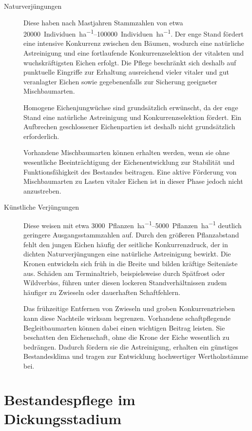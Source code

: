 \documentclass[twocolumn, bibliography=totoc, abstract=true]{scrartcl}
\begin{document}
\begin{description}
\item[Naturverjüngungen]
  Diese haben nach Mastjahren Stammzahlen von etwa \qtyrange{20000}{100000}{Individuen\per\hectare}. Der enge Stand fördert eine intensive Konkurrenz zwischen den Bäumen, wodurch eine natürliche Astreinigung und eine fortlaufende Konkurrenzselektion der vitalsten und wuchskräftigsten Eichen erfolgt. Die Pflege beschränkt sich deshalb auf punktuelle Eingriffe zur Erhaltung ausreichend vieler vitaler und gut veranlagter Eichen sowie gegebenenfalls zur Sicherung geeigneter Mischbaumarten.

  Homogene Eichenjungwüchse sind grundsätzlich erwünscht, da der enge Stand eine natürliche Astreinigung und Konkurrenzselektion fördert. Ein Aufbrechen geschlossener Eichenpartien ist deshalb nicht grundsätzlich erforderlich.

  Vorhandene Mischbaumarten können erhalten werden, wenn sie ohne wesentliche Beeinträchtigung der Eichenentwicklung zur Stabilität und Funktionsfähigkeit des Bestandes beitragen. Eine aktive Förderung von Mischbaumarten zu Lasten vitaler Eichen ist in dieser Phase jedoch nicht anzustreben.

\item[Künstliche Verjüngungen]
  Diese weisen mit etwa \qtyrange{3000}{5000}{Pflanzen\per\hectare} deutlich geringere Ausgangsstammzahlen auf. Durch den größeren Pflanzabstand fehlt den jungen Eichen häufig der seitliche Konkurrenzdruck, der in dichten Naturverjüngungen eine natürliche Astreinigung bewirkt. Die Kronen entwickeln sich früh in die Breite und bilden kräftige Seitenäste aus. Schäden am Terminaltrieb, beispielsweise durch Spätfrost oder Wildverbiss, führen unter diesen lockeren Standverhältnissen zudem häufiger zu Zwieseln oder dauerhaften Schaftfehlern.

  Das frühzeitige Entfernen von Zwieseln und groben Konkurrenztrieben kann diese Nachteile wirksam begrenzen. Vorhandene schaftpflegende Begleitbaumarten können dabei einen wichtigen Beitrag leisten. Sie beschatten den Eichenschaft, ohne die Krone der Eiche wesentlich zu bedrängen. Dadurch fördern sie die Astreinigung, erhalten ein günstiges Bestandesklima und tragen zur Entwicklung hochwertiger Wertholzstämme bei.
\end{description}

\section{Bestandespflege im Dickungsstadium}
\end{document}
